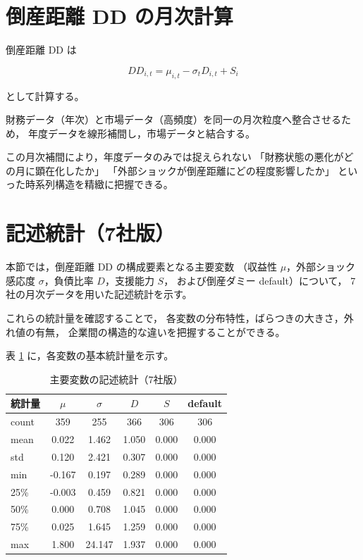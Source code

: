 \section{倒産距離 DD の月次計算}

倒産距離 DD は



\[
DD_{i,t} = \mu_{i,t} - \sigma_t D_{i,t} + S_i
\]



として計算する。

財務データ（年次）と市場データ（高頻度）を同一の月次粒度へ整合させるため，
年度データを線形補間し，市場データと結合する。

この月次補間により，年度データのみでは捉えられない
「財務状態の悪化がどの月に顕在化したか」
「外部ショックが倒産距離にどの程度影響したか」
といった時系列構造を精緻に把握できる。

\section{記述統計（7社版）}

本節では，倒産距離 DD の構成要素となる主要変数
（収益性 $\mu$，外部ショック感応度 $\sigma$，負債比率 $D$，支援能力 $S$，
および倒産ダミー default）について，
7 社の月次データを用いた記述統計を示す。

これらの統計量を確認することで，
各変数の分布特性，ばらつきの大きさ，外れ値の有無，
企業間の構造的な違いを把握することができる。

表 \ref{tab:desc_stats_7firms} に，各変数の基本統計量を示す。

\begin{table}[H]
\centering
\caption{主要変数の記述統計（7社版）}
\label{tab:desc_stats_7firms}
\begin{tabular}{lccccc}
\toprule
統計量 & $\mu$ & $\sigma$ & $D$ & $S$ & default \\
\midrule
count & 359 & 255 & 366 & 306 & 306 \\
mean  & 0.022 & 1.462 & 1.050 & 0.000 & 0.000 \\
std   & 0.120 & 2.421 & 0.307 & 0.000 & 0.000 \\
min   & -0.167 & 0.197 & 0.289 & 0.000 & 0.000 \\
25\%  & -0.003 & 0.459 & 0.821 & 0.000 & 0.000 \\
50\%  & 0.000 & 0.708 & 1.045 & 0.000 & 0.000 \\
75\%  & 0.025 & 1.645 & 1.259 & 0.000 & 0.000 \\
max   & 1.800 & 24.147 & 1.937 & 0.000 & 0.000 \\
\bottomrule
\end{tabular}
\end{table}


